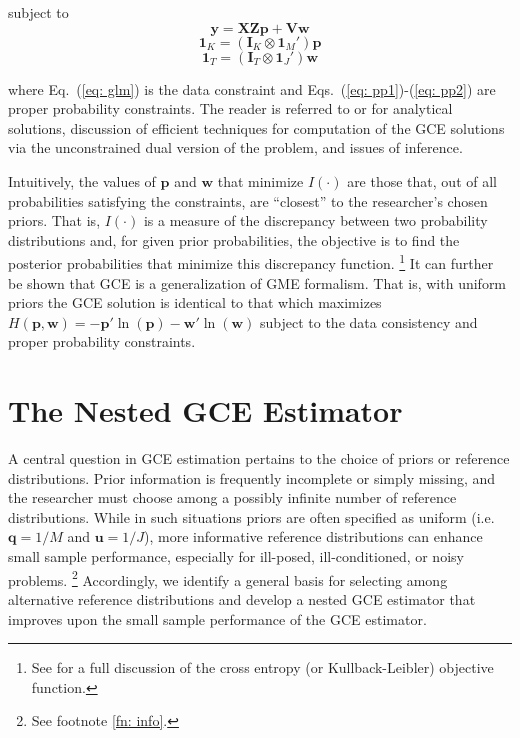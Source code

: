 \documentclass[english]{article}
\begin{document}
\noindent
subject to
\begin{equation}
\mathbf{y} = \mathbf{X Z p} 
+ \mathbf{V w}
\label{eq: glm}
\end{equation}
\begin{equation}
\mathbf{1}_K = (\mathbf{I}_K \otimes \mathbf{1}_M')\mathbf{p}
\label{eq: pp1}
\end{equation}
\begin{equation}
\mathbf{1}_T = (\mathbf{I}_T \otimes \mathbf{1}_J')\mathbf{w}
\label{eq: pp2}
\end{equation}

\noindent
where Eq.\ (\ref{eq: glm}) is the data constraint and Eqs.\ 
(\ref{eq: pp1})-(\ref{eq: pp2}) are proper probability constraints.
The reader is referred to \citet[Chap.\ 6]{golan1996} or 
\citet[Chap.\ 6]{golan2008} for analytical solutions, discussion of 
efficient techniques for computation of the GCE solutions via the 
unconstrained dual version of the problem, and issues of inference. 

Intuitively, the values of $\mathbf{p}$ and $\mathbf{w}$ that minimize
$I(\cdot)$ are those that, out of all probabilities satisfying the constraints, 
are ``closest'' to the researcher's chosen priors.
That is, $I(\cdot)$ is a measure of the discrepancy between two probability 
distributions and, for given prior probabilities, the objective is to find the 
posterior probabilities that minimize this discrepancy function.%
\footnote{See \citet[Chap.\ 6]{judge2011} for a full discussion of the 
cross entropy (or Kullback-Leibler) objective function.}
It can further be shown that GCE is a generalization of GME formalism.
That is, with uniform priors the GCE solution is identical to that which 
maximizes $H(\mathbf{p},\mathbf{w}) = - \mathbf{p}' \ln 
(\mathbf{p}) - \mathbf{w}' \ln (\mathbf{w})$ subject to the data
consistency and proper probability constraints. 


\section{The Nested GCE Estimator}
\label{sec: ngce}

A central question in GCE estimation pertains to the choice of 
priors or reference distributions.
Prior information is frequently incomplete or simply missing, and 
the researcher must choose among a possibly infinite number of 
reference distributions. 
While in such situations priors are often specified as uniform (i.e.\ 
$\mathbf{q}=1/M$ and $\mathbf{u}=1/J$), more informative 
reference distributions can enhance small sample performance, especially 
for ill-posed, ill-conditioned, or noisy problems.%
\footnote{See footnote \ref{fn: info}.}
Accordingly, we identify a general basis for selecting among alternative 
reference distributions and develop a nested GCE estimator that improves 
upon the small sample performance of the GCE estimator. 
\end{document}
